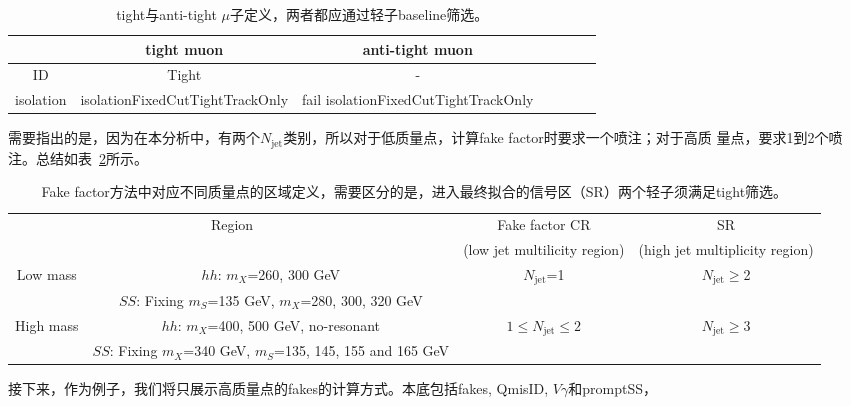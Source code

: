 \begin{table}[!ht]
\begin{center}
\begin{tabular}{c|cccccc}
\hline
  &tight muon    &anti-tight muon  \\
\hline
ID  &Tight  &- \\
isolation &isolationFixedCutTightTrackOnly  &fail isolationFixedCutTightTrackOnly \\
\hline
\end{tabular}
\caption{tight与anti-tight $\mu$子定义，两者都应通过轻子baseline筛选。}
\label{tab:tight_mu_def}
\end{center}
\end{table}
需要指出的是，因为在本分析中，有两个$N_{\text{jet}}$类别，所以对于低质量点，计算fake factor时要求一个喷注；对于高质
量点，要求1到2个喷注。总结如表~\ref{tab:summary_CRs_ff}所示。
\begin{table}[!ht]
\begin{center}
\scriptsize
\begin{tabular}{cc|c|c}
\hline
\multicolumn{2}{c|}{Region}  &Fake factor CR &SR   \\
                      			&    &(low jet multilicity region)  &(high jet multiplicity region) \\
\hline
\multirow{2}{*}{Low mass} &$hh$: $m_X$=260, 300 GeV  &$N_{\text{jet}}$=1    &$N_{\text{jet}} \geq$2 \\
                          &$SS$: Fixing $m_S$=135 GeV, $m_X$=280, 300, 320 GeV  &  & \\
\hline
\multirow{2}{*}{High mass} &$hh$: $m_X$=400, 500 GeV, no-resonant  &$1\leq N_{\text{jet}} \leq 2$    &$N_{\text{jet}} \geq$3 \\
                          &$SS$: Fixing $m_X$=340 GeV, $m_S$=135, 145, 155 and 165 GeV  &  & \\

\hline
\end{tabular}
\caption{Fake factor方法中对应不同质量点的区域定义，需要区分的是，进入最终拟合的信号区（SR）两个轻子须满足tight筛选。}
\label{tab:summary_CRs_ff}
\end{center}
\end{table}
接下来，作为例子，我们将只展示高质量点的fakes的计算方式。本底包括fakes, QmisID, $V\gamma$和promptSS，
